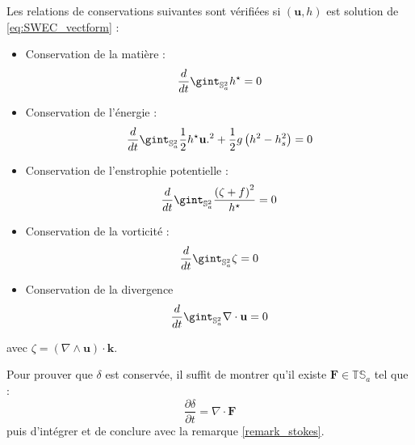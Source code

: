 \begin{proposition}
Les relations de conservations suivantes sont vérifiées si $(\mathbf{u},h)$ est solution de \eqref{eq:SWEC_vectform} :
\begin{itemize}
\item Conservation de la matière :
\begin{equation}
\dfrac{d}{dt} \gint_{\mathbb{S}_a^2} h^{\star} = 0
\label{eq:mass}
\end{equation}
 
\item Conservation de l'énergie :
\begin{equation}
\dfrac{d}{dt} \gint_{\mathbb{S}_a^2} \dfrac{1}{2} h^{\star} \mathbf{u}.^2 + \dfrac{1}{2} g \left( h^2 - h_s^2 \right) = 0
\label{eq:energy}
\end{equation}

\item Conservation de l'enstrophie potentielle :
\begin{equation}
\dfrac{d}{dt} \gint_{\mathbb{S}_a^2} \dfrac{\left( \zeta + f \right)^2}{h^{\star}} = 0
\label{eq:enstrophie}
\end{equation}

\item Conservation de la vorticité :
\begin{equation}
\dfrac{d}{dt} \gint_{\mathbb{S}_a^2} \zeta = 0
\label{eq:vorticity}
\end{equation}

\item Conservation de la divergence
\begin{equation}
\dfrac{d}{dt} \gint_{\mathbb{S}_a^2} \nabla \cdot \mathbf{u} = 0
\label{eq:divergence}
\end{equation}
\end{itemize}

avec $\zeta = \left( \nabla \wedge \mathbf{u} \right) \cdot \mathbf{k}$.
\end{proposition}

\begin{remarque}
Pour prouver que $\delta$ est conservée, il suffit de montrer qu'il existe $\mathbf{F} \in \mathbb{T} \mathbb{S}_a$ tel que :
$$
\dfrac{\partial \delta}{\partial t} = \nabla \cdot \mathbf{F}
$$
puis d'intégrer et de conclure avec la remarque \ref{remark_stokes}.
\label{rmq:int diverg nulle}
\end{remarque}

